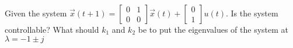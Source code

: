 \begin{enumerate}











\qitem Given the system  $\vec{x}(t+1) = \begin{bmatrix} 0 & 1 \\ 0 & 0 \end{bmatrix} \vec{x}(t) + \begin{bmatrix} 0 \\ 1 \end{bmatrix} u(t)$. Is the system controllable? What should $k_1$ and $k_2$ be to put the eigenvalues of the system at $\lambda = -1 \pm j$


\end{enumerate}
